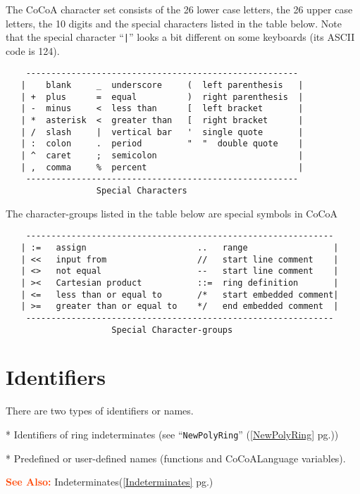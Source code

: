 \documentclass[a4paper]{mybook}
\newcommand\SeeAlso{\par\textcolor{OrangeRed}{\textbf{\large See Also: }}}
\begin{document}
        
The CoCoA character set consists of the 26 lower case letters, the 26
upper case letters, the 10 digits and the special characters listed in
the table below.  Note that the special character ``\verb&|&'' looks a bit
different on some keyboards (its ASCII code is 124).
\begin{verbatim}
    ------------------------------------------------------
   |    blank     _  underscore     (  left parenthesis   |
   | +  plus      =  equal          )  right parenthesis  |
   | -  minus     <  less than      [  left bracket       |
   | *  asterisk  <  greater than   [  right bracket      |
   | /  slash     |  vertical bar   '  single quote       |
   | :  colon     .  period         "  "  double quote    |
   | ^  caret     ;  semicolon                            |
   | ,  comma     %  percent                              |
    ------------------------------------------------------
                  Special Characters
\end{verbatim}
The character-groups listed in the table below are special symbols in CoCoA
\begin{verbatim}
    -------------------------------------------------------------
   | :=   assign                      ..   range                 |
   | <<   input from                  //   start line comment    |
   | <>   not equal                   --   start line comment    |
   | ><   Cartesian product           ::=  ring definition       |
   | <=   less than or equal to       /*   start embedded comment|
   | >=   greater than or equal to    */   end embedded comment  |
    -------------------------------------------------------------
                     Special Character-groups
\end{verbatim}


\section{Identifiers}
\label{Identifiers}

        
There are two types of identifiers or names.
\par 
  * Identifiers of ring indeterminates (see ``\verb&NewPolyRing&'' (\ref{NewPolyRing} pg.\pageref{NewPolyRing}))
\par 
  * Predefined or user-defined names (functions and CoCoALanguage variables).

\SeeAlso %
  Indeterminates(\ref{Indeterminates} pg.\pageref{Indeterminates})
\end{document}
